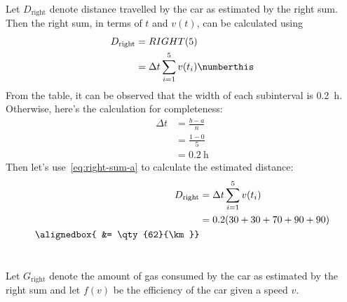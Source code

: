 \documentclass[
  coursecode={APSC 171},
  assignmentname={Week 6 Material - Defining and Estimating Integrals as Areas},
  solutiontitle=Solution,
  nodate,
  draft,
]{
  ltxanswer%
}
\begin{document}
  \begin{questions}
    \setcounter{question}{24}
    \question{}\
    \begin{parts}
      \part{}
      \begin{solution}
        Let \(D_{\text{right}}\) denote distance travelled by the car as estimated by the right sum. Then the right sum, in terms of \(t\) and \(v(t)\), can be calculated using
        \begin{align*}
          D_{\text{right}} &= RIGHT(5)                                                          \\
                           &= \Delta t \sum_{i=1}^{5} v(t_{i})\numberthis\label{eq:right-sum-a}
        \end{align*}
        From the table, it can be observed that the width of each subinterval is \qty{0.2}{\hour}. Otherwise, here's the calculation for completeness:
        \begin{align*}
          \Delta t &= \frac{b-a}{n}    \\
                   &= \frac{1-0}{5}    \\
                   &= \qty{0.2}{\hour}
        \end{align*}
        Then let's use~\eqref{eq:right-sum-a} to calculate the estimated distance:
        \begin{align*}
          D_{\text{right}} &= \Delta t \sum_{i=1}^{5} v(t_{i}) \\
                           &= 0.2 (30 + 30 + 70 + 90 + 90)     \\
          \alignedbox{     &= \qty{62}{\km}}
        \end{align*}
      \end{solution}

      \part{}
      \begin{solution}
        Let \(G_{\text{right}}\) denote the amount of gas consumed by the car as estimated by the right sum and let \(f(v)\) be the efficiency of the car given a speed \(v\).


\end{solution}
\end{parts}
\end{questions}
\end{document}
